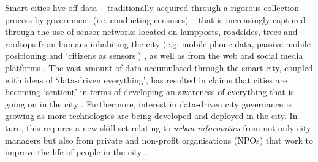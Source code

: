 Smart cities live off data -- traditionally acquired through a rigorous collection process by government (i.e. conducting censuses) -- that is increasingly captured through the use of sensor networks located on lampposts, roadsides, trees and rooftops \citep{su_smart_2011,zanella_internet_2014} from humans inhabiting the city (e.g. mobile phone data, passive mobile positioning and `citizens as sensors') \citep{ahas_using_2010,rein_ahas_mobile_2010,berntzen_citizens_2018}, as well as from the web and social media platforms \citep{batty_pulse_2010, puiu_citypulse:_2016}. The vast amount of data accumulated through the smart city, coupled with ideas of `data-driven everything', has resulted in claims that cities are becoming `sentient' in terms of developing an awareness of everything that is going on in the city \citep{thrift_sentient_2014}. Furthermore, interest in data-driven city governance is growing as more technologies are being developed and deployed in the city. In turn, this requires a new skill set relating to \textit{urban informatics} \citep{thakuriah_introduction_2017} from not only city managers but also from private and non-profit organisations (NPOs) that work to improve the life of people in the city \citep{foth_handbook_2009,kontokosta_urban_2017}.

